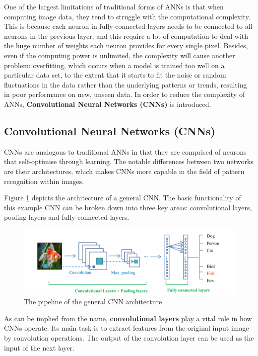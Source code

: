 One of the largest limitations of traditional forms of ANNs is that when computing image data, they tend to struggle with the computational complexity. This is because each neuron in fully-connected layers needs to be connected to all neurons in the previous layer, and this require a lot of computation to deal with the huge number of weights each neuron provides for every single pixel. Besides, even if the computing power is unlimited, the complexity will cause another problem: overfitting, which occurs when a model is trained too well on a particular data set, to the extent that it starts to fit the noise or random fluctuations in the data rather than the underlying patterns or trends, resulting in poor performance on new, unseen data. In order to reduce the complexity of ANNs, \textbf{Convolutional Neural Networks (CNNs)} is introduced. 

\subsection{Convolutional Neural Networks (CNNs)}

CNNs are analogous to traditional ANNs in that they are comprised of neurons that self-optimise through learning. The notable differences between two networks are their architectures, which makes CNNs more capable in the field of pattern recognition within images.

Figure \ref{fig:6} depicts the architecture of a general CNN. The basic functionality of this example CNN can be broken down into three key areas: convolutional layers, pooling layers and fully-connected layers.

\begin{figure}[h]
  \centering
  \includegraphics[width=1\textwidth]{Figures/CNN-architecture.png}
  \caption{The pipeline of the general CNN architecture \cite{guo_deep_2016}}
  \label{fig:6}
\end{figure}

As can be implied from the name, \textbf{convolutional layers} play a vital role in how CNNs operate. Its main task is to extract features from the original input image by convolution operations. The output of the convolution layer can be used as the input of the next layer. 

